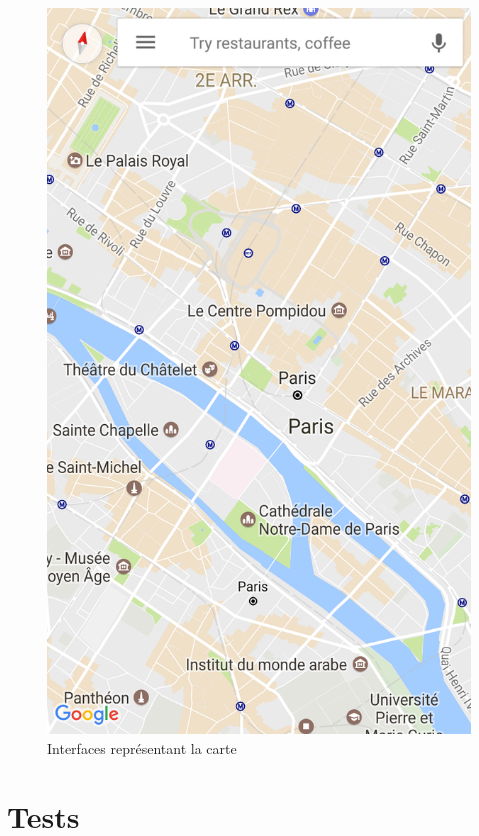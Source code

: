 \documentclass[a4paper, 12pt, notitlepage]{article} %
\begin{document}
\vfill
\begin{figure}[!htb]
    \centering
    \includegraphics[height=0.4\textheight]{Interface_Carte.png}
    \caption[]{Interfaces représentant la carte}
    \label{interface:carte}
\end{figure}
\vfill
\vfill
\clearpage

\section{Tests}
\end{document}
